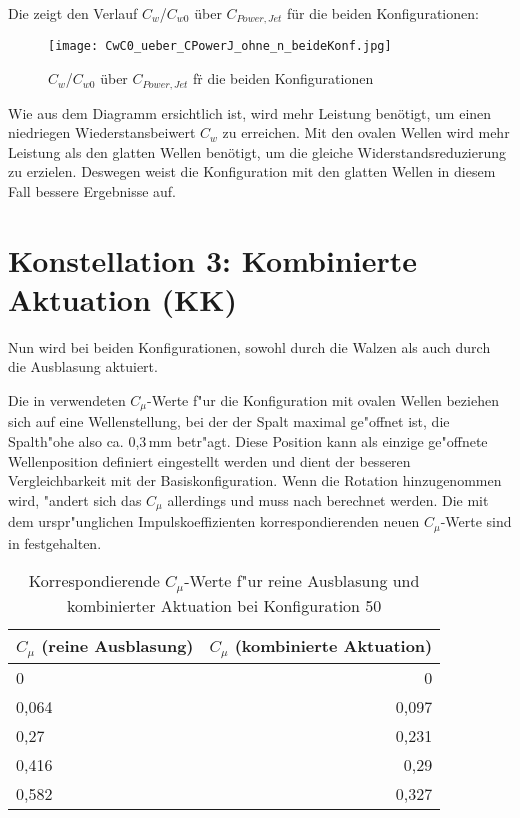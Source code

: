 Die  zeigt den Verlauf $C_{w}$/$C_{w0}$ \"uber $C_{Power,Jet}$  f\"ur die beiden Konfigurationen:
\begin{figure}[h]
	\centering
	\texttt{[image: CwC0\_ueber\_CPowerJ\_ohne\_n\_beideKonf.jpg]}
	\caption{$C_{w}$/$C_{w0}$  \"uber $C_{Power,Jet}$ f\"r die beiden Konfigurationen}
	\label{fig:Cw/Cw0-CpJet_Konf1+2}
\end{figure}

Wie aus dem Diagramm ersichtlich ist, wird mehr Leistung ben\"otigt, um einen niedriegen Wiederstansbeiwert $C_{w}$  zu erreichen. Mit den ovalen Wellen wird mehr Leistung als den glatten Wellen ben\"otigt, um die gleiche Widerstandsreduzierung zu erzielen. Deswegen weist die Konfiguration mit den glatten Wellen in diesem Fall bessere Ergebnisse auf.
\newpage

\section{Konstellation 3: Kombinierte Aktuation (KK)}
\label{s:kombinierteAkt}
Nun wird bei beiden Konfigurationen, sowohl durch die Walzen als auch durch die Ausblasung aktuiert.

Die in  verwendeten $C_{\mu}$-Werte f"ur die Konfiguration mit ovalen Wellen beziehen sich auf eine Wellenstellung, bei der der Spalt maximal ge"offnet ist, die Spalth"ohe also ca. 0,3\,mm betr"agt. Diese Position kann als einzige ge"offnete Wellenposition definiert eingestellt werden und dient der besseren Vergleichbarkeit mit der Basiskonfiguration. Wenn die Rotation hinzugenommen wird, "andert sich das $C_{\mu}$ allerdings und muss nach  berechnet werden. Die mit dem urspr"unglichen Impulskoeffizienten korrespondierenden neuen $C_{\mu}$-Werte sind in  festgehalten.

\begin{table}[H]
	\centering
	\begin{tabular}{lr}
		\toprule
		$C_{\mu}$ (reine Ausblasung) & $C_{\mu}$ (kombinierte Aktuation)\\
		\midrule
		0 & 0\\
		0,064 & 0,097\\
		0,27 & 0,231\\
		0,416 & 0,29\\
		0,582 & 0,327\\
		\bottomrule
	\end{tabular}
	\caption{Korrespondierende $C_{\mu}$-Werte f"ur reine Ausblasung und kombinierter Aktuation bei Konfiguration 50}
	\label{tab:Cmu Korrektur}
\end{table}


